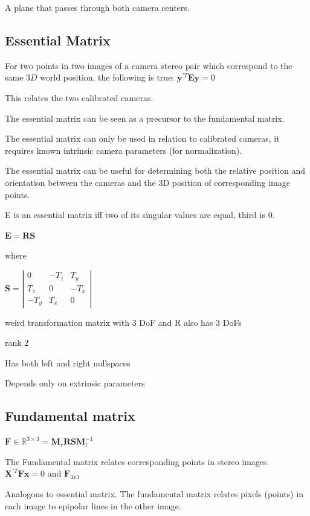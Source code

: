 A plane that passes through both camera centers.

\subsection{Essential Matrix}

For two points in two images of a camera stereo pair which correspond to the same $3D$ world position, the following is true: 
$\mathbf{y}^{\prime T}\mathbf{Ey}=0$

This relates the two calibrated cameras.

The essential matrix can be seen as a precursor to the fundamental matrix. 

The essential matrix can only be used in relation to calibrated cameras, it requires known intrinsic camera parameters (for normalization).

The essential matrix can be useful for determining both the relative position and orientation between the cameras and the 3D position of corresponding image points.

 E is an essential matrix iff two of its singular values are equal, third is 0.

$\mathbf{E}=\mathbf{RS}$

where 

$\mathbf{S} = \left| \begin{matrix} 0 & -T_z & T_y \\ T_z & 0 & -T_x \\ -T_y & T_x & 0  \end{matrix} \right|$

weird transformation matrix with 3 DoF and R also has 3 DoFs

rank 2 

Has both left and right nullspaces

Depends only on extrinsic parameters

\subsection{ Fundamental matrix}

$\mathbf F \in \mathbb{R}^{3\times3} = \mathbf{M}_r\mathbf{RSM}_l^{-1}$ 

The Fundamental matrix relates corresponding points in stereo images.
$\mathbf{X}^{\prime T}\mathbf{Fx}=0$ and $\mathbf{F}_{3x3}$

Analogous to essential matrix. The fundamental matrix relates pixels (points) in each image to epipolar lines in the other image.

